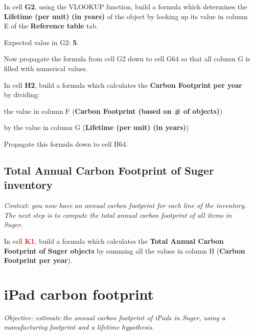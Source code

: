 \documentclass{exam}
\begin{document}
\begin{questions}
  \question In cell \textbf{G2}, using the VLOOKUP function, build a formula which determines the \textbf{Lifetime (per unit) (in years)} of the object by looking up its value in column E of the \textbf{Reference table} tab.
  \begin{compactitem}
    \item Expected value in G2: \textbf{5}.
  \end{compactitem}

  \question Now propagate the formula from cell G2 down to cell G64 so that all column G is filled with numerical values.

  \question In cell \textbf{H2}, build a formula which calculates the \textbf{Carbon Footprint per year} by dividing:
  \begin{compactitem}
    \item the value in column F (\textbf{Carbon Footprint (based on \# of objects)})
    \item by the value in column G (\textbf{Lifetime (per unit) (in years)})
  \end{compactitem}

  \question Propagate this formula down to cell H64.
\end{questions}

\subsection{Total Annual Carbon Footprint of Suger inventory}

\textit{Context: you now have an annual carbon footprint for each line of the inventory. The next step is to compute the total annual carbon footprint of all items in Suger.}

\begin{questions}
  \question In cell \textbf{\textcolor{red}{K1}}, build a formula which calculates the \textbf{Total Annual Carbon Footprint of Suger objects} by summing all the values in column H (\textbf{Carbon Footprint per year}).
\end{questions}

\section{iPad carbon footprint}

\textit{Objective: estimate the annual carbon footprint of iPads in Suger, using a manufacturing footprint and a lifetime hypothesis.}
\end{document}
